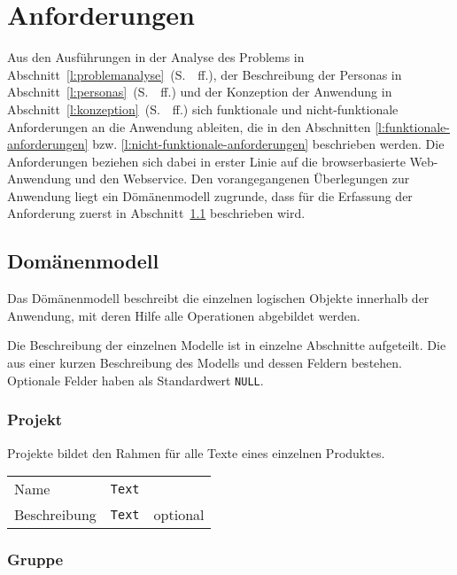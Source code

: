 \section{Anforderungen}\label{l:anforderungen}

Aus den Ausführungen in der Analyse des Problems in Abschnitt~\ref{l:problemanalyse}~(S.~\pageref{l:problemanalyse}~ff.), der Beschreibung der Personas in Abschnitt~\ref{l:personas}~(S.~\pageref{l:personas}~ff.) und der Konzeption der Anwendung in Abschnitt~\ref{l:konzeption}~(S.~\pageref{l:konzeption}~ff.) sich funktionale und nicht-funktionale Anforderungen an die Anwendung ableiten, die in den Abschnitten \ref{l:funktionale-anforderungen} bzw. \ref{l:nicht-funktionale-anforderungen} beschrieben werden. Die Anforderungen beziehen sich dabei in erster Linie auf die browserbasierte Web-Anwendung und den Webservice. Den vorangegangenen Überlegungen zur Anwendung liegt ein Dömänenmodell zugrunde, dass für die Erfassung der Anforderung zuerst in Abschnitt~\ref{l:domänenmodell} beschrieben wird.

\subsection{Domänenmodell}\label{l:domänenmodell}

Das Dömänenmodell beschreibt die einzelnen logischen Objekte innerhalb der Anwendung, mit deren Hilfe alle Operationen abgebildet werden. 

Die Beschreibung der einzelnen Modelle ist in einzelne Abschnitte aufgeteilt. Die aus einer kurzen Beschreibung des Modells und dessen Feldern bestehen. Optionale Felder haben als Standardwert \texttt{NULL}.

\subsubsection{Projekt}\label{model:projekt}

Projekte bildet den Rahmen für alle Texte eines einzelnen Produktes.

\begin{tabular}{@{}l l l}
\hline
Name&\texttt{Text}&\\
Beschreibung&\texttt{Text}&optional\\
\hline
\end{tabular}

\subsubsection{Gruppe}\label{model:gruppe}

